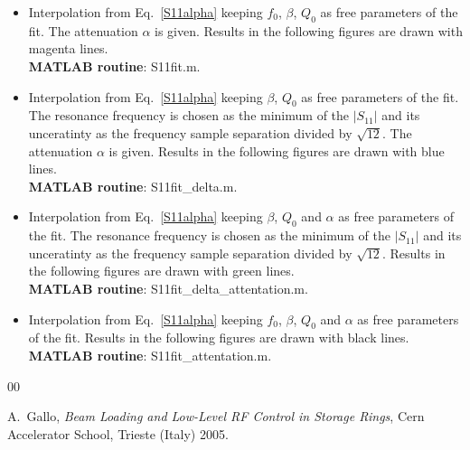 \documentclass[aps,onecolumn,floatfix,superscriptaddress,a4]{revtex4}
\begin{document}
\begin{itemize}
\item
Interpolation from Eq.~\ref{S11alpha} keeping $f_0$, $\beta$, $Q_0$ as free parameters of the
fit. The attenuation $\alpha$ is given. Results in the following figures are drawn with 
magenta lines.
\\ {\bf MATLAB routine}: S11fit.m.
\item
Interpolation from Eq.~\ref{S11alpha} keeping $\beta$, $Q_0$ as free parameters of the
fit. The resonance frequency is chosen as the minimum of the $\left|S_{11}\right|$ and its
unceratinty as the frequency sample separation divided by $\sqrt{12}$. The attenuation $\alpha$
is given.  Results in the following figures are drawn with 
blue lines.
\\ {\bf MATLAB routine}: S11fit\_delta.m.
\item
Interpolation from Eq.~\ref{S11alpha} keeping $\beta$, $Q_0$ and $\alpha$ as free parameters of the
fit. The resonance frequency is chosen as the minimum of the $\left|S_{11}\right|$ and its
unceratinty as the frequency sample separation divided by $\sqrt{12}$. Results in the following
figures are drawn with green lines. 
\\ {\bf MATLAB routine}: S11fit\_delta\_attentation.m.
\item
Interpolation from Eq.~\ref{S11alpha} keeping $f_0$, $\beta$, $Q_0$ and $\alpha$ as free
parameters of the 
fit. Results in the following
figures are drawn with black lines. 
\\ {\bf MATLAB routine}: S11fit\_attentation.m.
\end{itemize}


\begin{thebibliography}{00}

A.~Gallo, {\it Beam Loading and Low-Level RF Control in Storage Rings},
Cern Accelerator School, Trieste (Italy) 2005.

\end{thebibliography}
\end{document}
